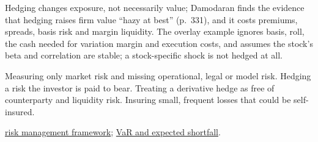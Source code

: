 \begin{qfmethod}
 Hedging changes exposure, not necessarily value; Damodaran finds the evidence that hedging raises firm value ``hazy at best'' (p.~331), and it costs premiums, spreads, basis risk and margin liquidity. The overlay example ignores basis, roll, the cash needed for variation margin and execution costs, and assumes the stock's beta and correlation are stable; a stock-specific shock is not hedged at all.

 Measuring only market risk and missing operational, legal or model risk. Hedging a risk the investor is paid to bear. Treating a derivative hedge as free of counterparty and liquidity risk. Insuring small, frequent losses that could be self-insured.

 \hyperref[def:risk-management-framework]{risk management framework}; \hyperref[meth:var-es-estimation-methods]{VaR and expected shortfall}.

\end{qfmethod}
